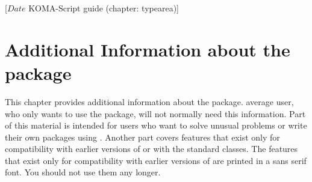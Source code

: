 %
%
%
%
%
%
%
%
% 
%
%
%
%

                 [$Date$
                  KOMA-Script guide (chapter: typearea)]


\chapter{Additional Information about the  package}
\BeginIndexGroup
{}

This chapter provides additional information about the 
package.  average user, who only wants to use the package, will not
normally need this information. Part of this material is intended for users
who want to solve unusual problems or write their own packages using
. Another part covers  features that exist
only for compatibility with earlier versions of \KOMAScript{} or with the
standard classes. The features that exist only for compatibility with earlier
versions of \KOMAScript{} are printed in a sans serif font. You should not use
them any longer.


